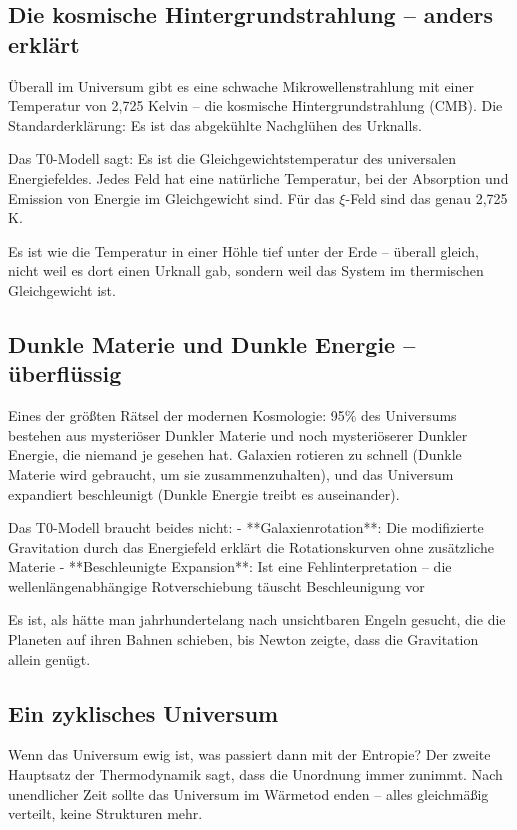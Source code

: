 \documentclass[12pt,a4paper]{article}
\newcommand{\xipar}{\ensuremath{\xi}}
\begin{document}
	\subsection{Die kosmische Hintergrundstrahlung -- anders erklärt}
	
	Überall im Universum gibt es eine schwache Mikrowellenstrahlung mit einer Temperatur von 2,725 Kelvin -- die kosmische Hintergrundstrahlung (CMB). Die Standarderklärung: Es ist das abgekühlte Nachglühen des Urknalls.
	
	Das T0-Modell sagt: Es ist die Gleichgewichtstemperatur des universalen Energiefeldes. Jedes Feld hat eine natürliche Temperatur, bei der Absorption und Emission von Energie im Gleichgewicht sind. Für das $\xipar$-Feld sind das genau 2,725 K.
	
	Es ist wie die Temperatur in einer Höhle tief unter der Erde -- überall gleich, nicht weil es dort einen Urknall gab, sondern weil das System im thermischen Gleichgewicht ist.
	
	\subsection{Dunkle Materie und Dunkle Energie -- überflüssig}
	
	Eines der größten Rätsel der modernen Kosmologie: 95\% des Universums bestehen aus mysteriöser Dunkler Materie und noch mysteriöserer Dunkler Energie, die niemand je gesehen hat. Galaxien rotieren zu schnell (Dunkle Materie wird gebraucht, um sie zusammenzuhalten), und das Universum expandiert beschleunigt (Dunkle Energie treibt es auseinander).
	
	Das T0-Modell braucht beides nicht:
	- **Galaxienrotation**: Die modifizierte Gravitation durch das Energiefeld erklärt die Rotationskurven ohne zusätzliche Materie
	- **Beschleunigte Expansion**: Ist eine Fehlinterpretation -- die wellenlängenabhängige Rotverschiebung täuscht Beschleunigung vor
	
	Es ist, als hätte man jahrhundertelang nach unsichtbaren Engeln gesucht, die die Planeten auf ihren Bahnen schieben, bis Newton zeigte, dass die Gravitation allein genügt.
	
	\subsection{Ein zyklisches Universum}
	
	Wenn das Universum ewig ist, was passiert dann mit der Entropie? Der zweite Hauptsatz der Thermodynamik sagt, dass die Unordnung immer zunimmt. Nach unendlicher Zeit sollte das Universum im Wärmetod enden -- alles gleichmäßig verteilt, keine Strukturen mehr.
	
\end{document}
